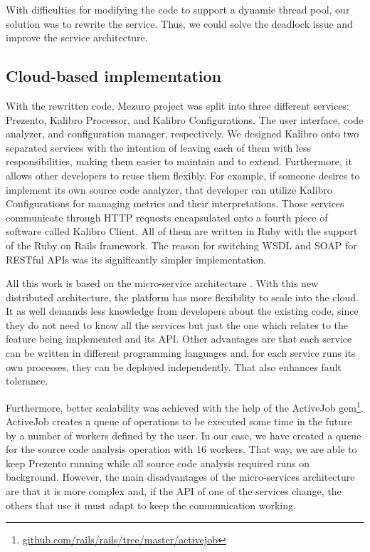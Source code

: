 With difficulties for modifying the code to support a dynamic thread pool, our
solution was to rewrite the service. Thus, we could solve the deadlock issue
and improve the service architecture.

\subsection{Cloud-based implementation}
\label{subsec:cloud-based-implementation}

With the rewritten code, Mezuro project was split into three different
services: Prezento, Kalibro Processor, and Kalibro Configurations. The user
interface, code analyzer, and configuration manager, respectively. We designed
Kalibro onto two separated services with the intention of leaving each of them
with less responsibilities, making them easier to maintain and to extend.
Furthermore, it allows other developers to reuse them flexibly. For example, if
someone desires to implement its own source code analyzer, that developer can
utilize Kalibro Configurations for managing metrics and their interpretations.
Those services communicate through HTTP requests encapsulated onto a fourth
piece of software called Kalibro Client.  All of them are written in Ruby with
the support of the Ruby on Rails framework. The reason for switching WSDL and
SOAP for RESTful APIs was its significantly simpler implementation.

All this work is based on the micro-service architecture
\cite{namiot2014micro}. With this new distributed architecture, the platform has
more flexibility to scale into the cloud. It as well demands less knowledge
from developers about the existing code, since they do not need to know all the
services but just the one which relates to the feature being implemented and
its API. Other advantages are that each service can be written in different
programming languages and, for each service runs its own processes, they can be
deployed independently. That also enhances fault tolerance.

Furthermore, better scalability was achieved with the help of the ActiveJob
gem\footnote{\url{github.com/rails/rails/tree/master/activejob}}.  ActiveJob
creates a queue of operations to be executed some time in the future by a
number of workers defined by the user. In our case, we have created a queue for
the source code analysis operation with 16 workers. That way, we are able to
keep Prezento running while all source code analysis required runs on
background. However, the main disadvantages of the micro-services architecture
are that it is more complex and, if the API of one of the services change, the
others that use it must adapt to keep the communication working.

